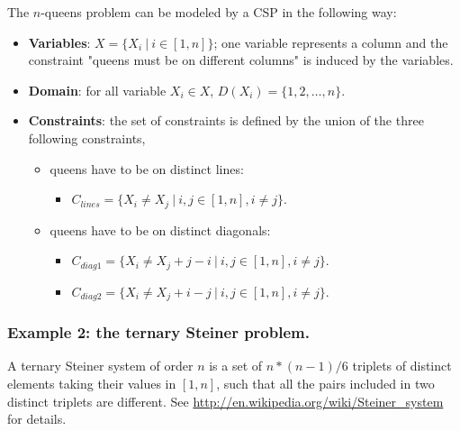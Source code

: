 The $n$-queens problem can be modeled by a CSP in the following way:
\begin{itemize}
	\item \textbf{Variables}: $X = \{X_{i}\ |\ i\in [1,n]\}$; one variable represents a column and the constraint "queens must be on different columns" is induced by the variables.
	\item \textbf{Domain}: for all variable $X_{i}\in X$, $D(X_{i}) = \{1,2,\ldots, n\}$.
	\item \textbf{Constraints}: the set of constraints is defined by the union of the three following constraints,
	\begin{itemize}
		\item queens have to be on distinct lines:
		\begin{itemize}
			\item $C_{lines} = \{X_{i}\neq X_{j}\ |\ i,j\in [1,n], i\neq j\}$.
		\end{itemize}
		\item queens have to be on distinct diagonals:
		\begin{itemize}
			\item $C_{diag1} = \{X_{i}\neq X_{j}+j-i\ |\ i,j\in [1,n], i\neq j\}$.
			\item $C_{diag2} = \{X_{i}\neq X_{j}+i-j\ |\ i,j\in [1,n], i\neq j\}$.
		\end{itemize}
	\end{itemize}
\end{itemize}

\subsubsection{Example 2: the ternary Steiner problem.}\label{introduction:example2:theternarysteinerproblem}\hypertarget{introduction:example2:theternarysteinerproblem}{}
A ternary Steiner system of order $n$ is a set of $n*(n-1)/6$ triplets of distinct elements taking their values in $[1,n]$, such that all the pairs included in two distinct triplets are different.
See \url{http://en.wikipedia.org/wiki/Steiner_system} for details. 

